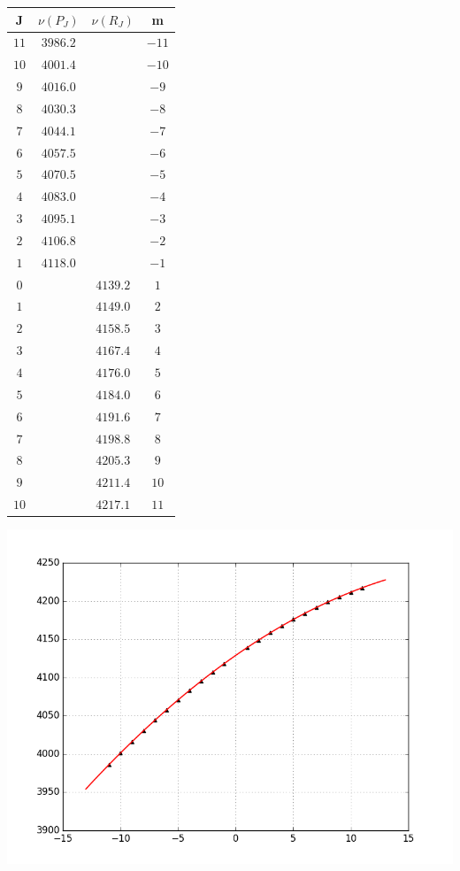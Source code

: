 \documentclass[13pt]{extarticle}
\newcommand{\lb}{\left(}
\newcommand{\rb}{\right)}
\begin{document}
\begin{table}
\begin{minipage}{0.6\textwidth}
	\end{minipage}
\end{table}

\clearpage
\begin{table}
	\begin{minipage}{0.4\textwidth}
		\begin{tabular}{|c|c|c|c|}
			\hline
			J & $\nu \lb P_J \rb$ & $\nu \lb R_J \rb$ & m \\
			\hline
			$11$ & $3986.2$ & & $-11$ \\
			$10$ & $4001.4$ & & $-10$ \\
			$9$ & $4016.0$ & & $-9$ \\
			$8$ & $4030.3$ & & $-8$ \\
			$7$ & $4044.1$ & & $-7$ \\
			$6$ & $4057.5$ & & $-6$ \\
			$5$ & $4070.5$ & & $-5$ \\
			$4$ & $4083.0$ & & $-4$ \\
			$3$ & $4095.1$ & & $-3$ \\
			$2$ & $4106.8$ & & $-2$ \\
			$1$ & $4118.0$ & & $-1$ \\
			$0$ & & $4139.2$ & $1$ \\
			$1$ & & $4149.0$ & $2$ \\
			$2$ & & $4158.5$ & $3$ \\
			$3$ & & $4167.4$ & $4$ \\
			$4$ & & $4176.0$ & $5$ \\
			$5$ & & $4184.0$ & $6$ \\
			$6$ & & $4191.6$ & $7$ \\
			$7$ & & $4198.8$ & $8$ \\
			$8$ & & $4205.3$ & $9$ \\
			$9$ & & $4211.4$ & $10$ \\
			$10$ & & $4217.1$ & $11$ \\
			\hline
		\end{tabular}
	\end{minipage}
	\begin{minipage}{0.6\textwidth}
		\includegraphics[scale=0.6]{pictures/pic2.png}

\end{minipage}
\end{table}
\end{document}
